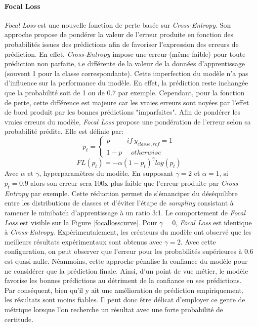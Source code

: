 \paragraph{Focal Loss}
\textit{Focal Loss} est une nouvelle fonction de perte basée sur \textit{Cross-Entropy}. Son approche propose de pondérer la valeur de l'erreur produite en fonction des probabilités issues des prédictions afin de favoriser l'expression des erreurs de prédiction. En effet, \textit{Cross-Entropy} impose une erreur (même faible) pour toute prédiction non parfaite, i.e différente de la valeur de la données d'apprentissage (souvent 1 pour la classe correspondante). Cette imperfection du modèle n'a pas d'influence sur la performance du modèle. En effet, la prédiction reste inchangée que la probabilité soit de 1 ou de 0.7 par exemple. Cependant, pour la fonction de perte, cette différence est majeure car les vraies erreurs sont noyées par l'effet de bord produit par les bonnes prédictions "imparfaites". Afin de pondérer les vraies erreurs du modèle, \textit{Focal Loss} propose une pondération de l'erreur selon sa probabilité prédite. Elle est définie par:
$$p_t=\left\{ \begin{array}{ll} p \  \  \  \  \  \  \  \  \  \  \  if \ y_{classe,ref}=1\\ 1-p \  \  \  \  \  \ otherwise \end{array} \right. $$
$$FL(p_t)=-\alpha(1-p_t)^\gamma log(p_t)$$
\noindent Avec $\alpha$ et $\gamma$, hyperparamètres du modèle. En supposant $\gamma=2$ et $\alpha=1$, si $p_t=0.9$ alors son erreur sera 100x plus faible que l'erreur produite par \textit{Cross-Entropy} par exemple. Cette réduction permet de s'émanciper du déséquilibre entre les distributions de classes et d'éviter l'étape de \textit{sampling} consistant à ramener le minibatch d'apprentissage à un ratio 3:1. Le comportement de \textit{Focal Loss} est visible sur la Figure \ref{focallosscurve}. Pour $\gamma=0$, \textit{Focal Loss} est identique à \textit{Cross-Entropy}. Expérimentalement, les créateurs du modèle ont observé que les meilleurs résultats expérimentaux sont obtenus avec $\gamma=2$. Avec cette configuration, on peut observer que l'erreur pour les probabilités supérieures à 0.6 est quasi-nulle. Néanmoins, cette approche pénalise la confiance du modèle pour ne considérer que la prédiction finale. Ainsi, d'un point de vue métier, le modèle favorise les bonnes prédictions au détriment de la confiance en ses prédictions. Par conséquent, bien qu'il y ait une amélioration de prédiction empiriquement, les résultats sont moins fiables. Il peut donc être délicat d'employer ce genre de métrique lorsque l'on recherche un résultat avec une forte probabilité de certitude.

